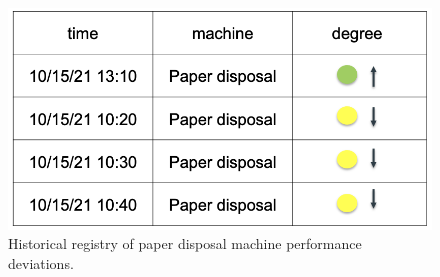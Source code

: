 \begin{figure}[h]
\centering
\graphicspath{ {./images/} }
\includegraphics[scale=0.49]{images/entsorgung_registry.png}
\caption{Historical registry of paper disposal machine performance deviations. }
\label{fig:fig17}
\end{figure}